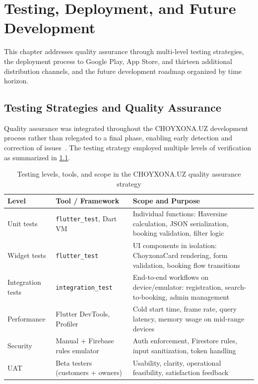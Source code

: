 \chapter{Testing, Deployment, and Future Development}
\label{ch:testing}

This chapter addresses quality assurance through multi-level testing strategies, the deployment process to Google Play, App Store, and thirteen additional distribution channels, and the future development roadmap organized by time horizon.


\section{Testing Strategies and Quality Assurance}
\label{sec:testing}

Quality assurance was integrated throughout the CHOYXONA.UZ development process rather than relegated to a final phase, enabling early detection and correction of issues~\cite{sommerville2015}.
The testing strategy employed multiple levels of verification as summarized in \cref{tab:testing-levels}.

\begin{table}[htbp]
\caption{Testing levels, tools, and scope in the CHOYXONA.UZ quality assurance strategy}
\label{tab:testing-levels}
\centering
\small
\begin{tabular}{llp{5.5cm}}
\toprule
\textbf{Level} & \textbf{Tool / Framework} & \textbf{Scope and Purpose} \\
\midrule
Unit tests     & \texttt{flutter\_test}, Dart VM & Individual functions: Haversine calculation, JSON serialization, booking validation, filter logic \\
Widget tests   & \texttt{flutter\_test}          & UI components in isolation: ChoyxonaCard rendering, form validation, booking flow transitions \\
Integration tests & \texttt{integration\_test}    & End-to-end workflows on device/emulator: registration, search-to-booking, admin management \\
Performance    & Flutter DevTools, Profiler      & Cold start time, frame rate, query latency, memory usage on mid-range devices \\
Security       & Manual + Firebase rules emulator & Auth enforcement, Firestore rules, input sanitization, token handling \\
UAT            & Beta testers (customers + owners) & Usability, clarity, operational feasibility, satisfaction feedback \\
\bottomrule
\end{tabular}
\end{table}

